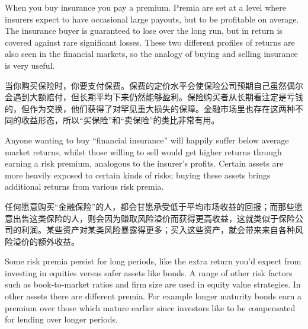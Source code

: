 
\begin{englishblock} When you buy insurance you pay a premium. Premia are set at a level where insurers expect to have occasional large payouts, but to be profitable on average. The insurance buyer is guaranteed to lose over the long run, but in return is covered against rare significant losses. These two different profiles of returns are also seen in the financial markets, so the analogy of buying and selling insurance is very useful. \end{englishblock}

\begin{chineseblock}当你购买保险时，你要支付保费。保费的定价水平会使保险公司预期自己虽然偶尔会遇到大额赔付，但长期平均下来仍然能够盈利。保险购买者从长期看注定是亏钱的，但作为交换，他们获得了对罕见重大损失的保障。金融市场里也存在这两种不同的收益形态，所以“买保险”和“卖保险”的类比非常有用。\end{chineseblock}

\bipairgap

\begin{englishblock} Anyone wanting to buy ``financial insurance'' will happily suffer below average market returns, whilst those willing to sell would get higher returns through earning a risk premium, analogous to the insurer's profits. Certain assets are more heavily exposed to certain kinds of risks; buying these assets brings additional returns from various risk premia. \end{englishblock}

\begin{chineseblock}任何愿意购买“金融保险”的人，都会甘愿承受低于平均市场收益的回报；而那些愿意出售这类保险的人，则会因为赚取风险溢价而获得更高收益，这就类似于保险公司的利润。某些资产对某类风险暴露得更多；买入这些资产，就会带来来自各种风险溢价的额外收益。\end{chineseblock}


\begin{englishblock} Some risk premia persist for long periods, like the extra return you'd expect from investing in equities versus safer assets like bonds. A range of other risk factors such as book-to-market ratios and firm size are used in equity value strategies. In other assets there are different premia. For example longer maturity bonds earn a premium over those which mature earlier since investors like to be compensated for lending over longer periods. \end{englishblock}

